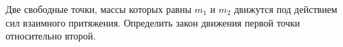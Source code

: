Две свободные точки, массы которых равны $m_1$ и $m_2$ движутся под
действием сил взаимного притяжения. Определить закон движения первой
точки относительно второй.
